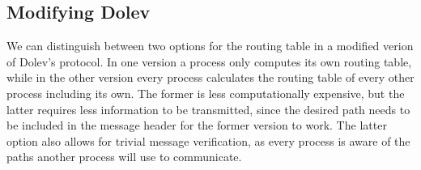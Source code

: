 \subsection{Modifying Dolev}
\label{contr:modifying-dolev}
We can distinguish between two options for the routing table in a modified verion of Dolev's protocol. 
In one version a process only computes its own routing table, while in the other version every process calculates the routing table of every other process including its own. The former is less computationally expensive, but the latter requires less information to be transmitted, since the desired path needs to be included in the message header for the former version to work. The latter option also allows for trivial message verification, as every process is aware of the paths another process will use to communicate. 





